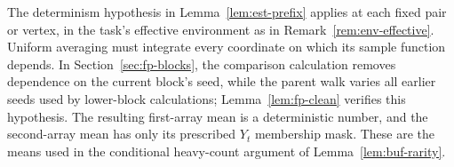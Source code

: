 The determinism hypothesis in Lemma~\ref{lem:est-prefix} applies at
each fixed pair or vertex, in the task's effective environment as in
Remark~\ref{rem:env-effective}.  Uniform averaging must integrate every
coordinate on which its sample function depends.  In
Section~\ref{sec:fp-blocks}, the comparison calculation removes dependence
on the current block's seed, while the parent walk varies all earlier
seeds used by lower-block calculations; Lemma~\ref{lem:fp-clean}
verifies this hypothesis.  The resulting first-array mean is a
deterministic number, and the second-array mean has only its prescribed
$Y_t$ membership mask.  These are the means used in the conditional
heavy-count argument of Lemma~\ref{lem:buf-rarity}.
